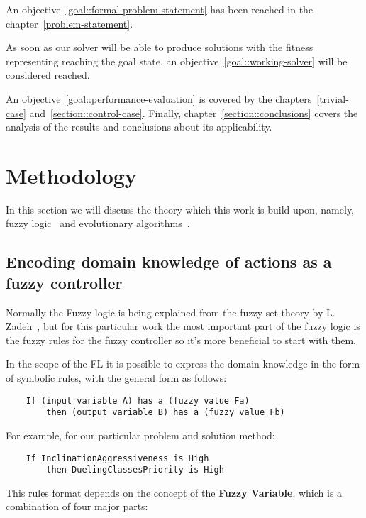 \documentclass[12pt, a4paper]{report}
\begin{document}
	An objective~\ref{goal::formal-problem-statement} has been reached in the chapter~\ref{problem-statement}.
	
	As soon as our solver will be able to produce solutions with the fitness representing reaching the goal state, an objective~\ref{goal::working-solver} will be considered reached.
	
	An objective~\ref{goal::performance-evaluation} is covered by the chapters~\ref{trivial-case} and~\ref{section::control-case}.
	Finally, chapter~\ref{section::conclusions} covers the analysis of the results and conclusions about its applicability.
	
	\chapter{Methodology}\label{methodology}

  In this section we will discuss the theory which this work is build upon, namely, fuzzy logic~\cite{ray2014softcomputing} and evolutionary algorithms~\cite{mitchell1999geneticalgorithms}.

	\section{Encoding domain knowledge of actions as a fuzzy controller}

  Normally the Fuzzy logic is being explained from the fuzzy set theory by L. Zadeh~\cite{zadeh1965fuzzy}, but for this particular work the most important part of the fuzzy logic is the fuzzy rules for the fuzzy controller so it's more beneficial to start with them.

  In the scope of the FL it is possible to express the domain knowledge in the form of symbolic rules, with the general form as follows:

  \begin{verbatim}
    If (input variable A) has a (fuzzy value Fa) 
    	then (output variable B) has a (fuzzy value Fb)
  \end{verbatim}

  For example, for our particular problem and solution method:

  \begin{verbatim}
    If InclinationAggressiveness is High 
    	then DuelingClassesPriority is High
  \end{verbatim}

  This rules format depends on the concept of the \textbf{Fuzzy Variable}, which is a combination of four major parts:
\end{document}
